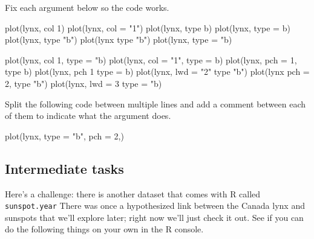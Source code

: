 \documentclass[
]{book}
\newenvironment{Shaded}{\begin{snugshade}}{\end{snugshade}}
\newcommand{\AttributeTok}[1]{\textcolor[rgb]{0.77,0.63,0.00}{#1}}
\newcommand{\DecValTok}[1]{\textcolor[rgb]{0.00,0.00,0.81}{#1}}
\newcommand{\FunctionTok}[1]{\textcolor[rgb]{0.00,0.00,0.00}{#1}}
\newcommand{\NormalTok}[1]{#1}
\newcommand{\StringTok}[1]{\textcolor[rgb]{0.31,0.60,0.02}{#1}}
\begin{document}
Fix each argument below so the code works.

\begin{Shaded}
\begin{Highlighting}[]
\FunctionTok{plot}\NormalTok{(lynx, col  }\DecValTok{1}\NormalTok{)}
\FunctionTok{plot}\NormalTok{(lynx, }\AttributeTok{col =} \StringTok{"1"}\NormalTok{)}
\FunctionTok{plot}\NormalTok{(lynx, type b)}
\FunctionTok{plot}\NormalTok{(lynx, }\AttributeTok{type =}\NormalTok{ b)}
\FunctionTok{plot}\NormalTok{(lynx, type }\StringTok{"b"}\NormalTok{)}
\FunctionTok{plot}\NormalTok{(lynx type }\StringTok{"b"}\NormalTok{)}
\FunctionTok{plot}\NormalTok{(lynx, }\AttributeTok{type =}  \StringTok{"b)}
\end{Highlighting}
\end{Shaded}

\begin{Shaded}
\begin{Highlighting}[]
\FunctionTok{plot}\NormalTok{(lynx, col  }\DecValTok{1}\NormalTok{, }\AttributeTok{type =} \StringTok{"b)}
\StringTok{plot(lynx, col = "}\DecValTok{1}\StringTok{", type = b)}
\StringTok{plot(lynx, pch = 1, type b)}
\StringTok{plot(lynx, pch 1 type = b)}
\StringTok{plot(lynx, lwd = "}\DecValTok{2}\StringTok{" type "}\NormalTok{b}\StringTok{")}
\StringTok{plot(lynx pch = 2, type "}\NormalTok{b}\StringTok{")}
\StringTok{plot(lynx, lwd = 3 type =  "}\NormalTok{b)}
\end{Highlighting}
\end{Shaded}

Split the following code between multiple lines and add a comment between each of them to indicate what the argument does.

\begin{Shaded}
\begin{Highlighting}[]
\FunctionTok{plot}\NormalTok{(lynx, }\AttributeTok{type =} \StringTok{"b"}\NormalTok{, }\AttributeTok{pch =}  \DecValTok{2}\NormalTok{,)}
\end{Highlighting}
\end{Shaded}

\hypertarget{intermediate-tasks}{%
\subsection{Intermediate tasks}\label{intermediate-tasks}}

Here's a challenge: there is another dataset that comes with R called \texttt{sunspot.year} There was once a hypothesized link between the Canada lynx and sunspots that we'll explore later; right now we'll just check it out. See if you can do the following things on your own in the R console.
\end{document}

